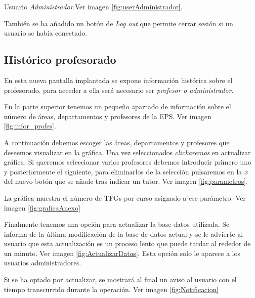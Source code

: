  Usuario \emph{Administrador}.Ver imagen \ref{fig:userAdministrador}.
 
 También se ha añadido un botón de \emph{Log out} que permite cerrar sesión si un usuario se había conectado.
 
\subsection{Histórico profesorado}
En esta nueva pantalla implantada se expone información histórica sobre el profesorado, para acceder a ella será necesario ser \emph{profesor o administrador}.

En la parte superior tenemos un pequeño apartado de información sobre el número de áreas, departamentos y profesores de la EPS. Ver imagen \ref{fig:infor_profes}.


A continuación debemos escoger las áreas, departamentos y profesores que deseemos visualizar en la gráfica. Una vez seleccionados \emph{clickaremos} en actualizar gráfica.
Si queremos seleccionar varios profesores debemos introducir primero uno y posteriormente el siguiente, para eliminarlos de la selección pulsaremos en la \emph{x} del nuevo botón que se añade tras indicar un tutor. Ver imagen \ref{fig:parametros}.


La gráfica muestra el número de TFGs por curso asignado a ese parámetro. Ver imagen \ref{fig:graficaAnexo}


Finalmente tenemos una opción para actualizar la base datos utilizada. Se informa de la última modificación de la base de datos actual y se le advierte al usuario que esta actualización es un proceso lento que puede tardar al rededor de un minuto. Ver imagen \ref{fig:ActualizarDatos}. Esta opción solo le aparece a los usuarios administradores.


Si se ha optado por actualizar, se mostrará al final un aviso al usuario con el tiempo transcurrido durante la operación. Ver imagen \ref{fig:Notificacion}


